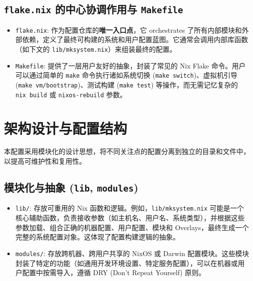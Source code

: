 \documentclass[11pt, a4paper]{article} %
\begin{document}
\subsection{\texttt{flake.nix} 的中心协调作用与 \texttt{Makefile}}
    \begin{itemize}
        \item \texttt{flake.nix}: 作为配置仓库的\textbf{唯一入口点}，它 orchestrates 了所有内部模块和外部依赖，定义了最终可构建的系统和用户配置蓝图。它通常会调用内部库函数（如下文的 \texttt{lib/mksystem.nix}）来组装最终的配置。
        \item \texttt{Makefile}: 提供了一层用户友好的抽象，封装了常见的 Nix Flake 命令。用户可以通过简单的 \texttt{make} 命令执行诸如系统切换 (\texttt{make switch})、虚拟机引导 (\texttt{make vm/bootstrap})、测试构建 (\texttt{make test}) 等操作，而无需记忆复杂的 \texttt{nix build} 或 \texttt{nixos-rebuild} 参数。
    \end{itemize}

\section{架构设计与配置结构}
本配置采用模块化的设计思想，将不同关注点的配置分离到独立的目录和文件中，以提高可维护性和复用性。

\subsection{模块化与抽象 (\texttt{lib}, \texttt{modules})}
    \begin{itemize}
        \item \texttt{lib/}: 存放可重用的 Nix 函数和逻辑。例如，\texttt{lib/mksystem.nix} 可能是一个核心辅助函数，负责接收参数（如主机名、用户名、系统类型），并根据这些参数加载、组合正确的机器配置、用户配置、模块和 Overlays，最终生成一个完整的系统配置对象。这体现了配置构建逻辑的抽象。
        \item \texttt{modules/}: 存放跨机器、跨用户共享的 NixOS 或 Darwin 配置模块。这些模块封装了特定的功能（如通用开发环境设置、特定服务配置），可以在机器或用户配置中按需导入，遵循 DRY (Don't Repeat Yourself) 原则。
    \end{itemize}
\end{document}
